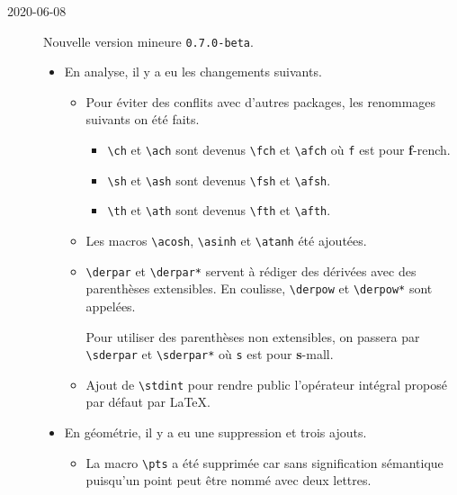 \documentclass[12pt,a4paper]{article}
\newcommand\env[1]{\texttt{#1}}
\newcommand\macro[1]{\env{\textbackslash{}#1}}
\theoremstyle{definition}
\begin{document}
\begin{description}

    \medskip
    \item[2020-06-08] Nouvelle version mineure \verb+0.7.0-beta+.
    
    \begin{itemize}[itemsep=.5em]
        \item En analyse, il y a eu les changements suivants.
        \begin{itemize}[itemsep=.5em]
            \item Pour éviter des conflits avec d'autres packages, les renommages suivants on été faits.
            \begin{itemize}[itemsep=.5em]
                \item \macro{ch} et \macro{ach} sont devenus \macro{fch} et \macro{afch} où \verb+f+ est pour \textbf{f}-rench.
    
                \item \macro{sh} et \macro{ash} sont devenus \macro{fsh} et \macro{afsh}.
    
                \item \macro{th} et \macro{ath} sont devenus \macro{fth} et \macro{afth}.
            \end{itemize}
    
    		\item Les macros \macro{acosh}, \macro{asinh} et \macro{atanh} été ajoutées.
    
     		\item \macro{derpar} et \macro{derpar*} servent à rédiger des dérivées avec des parenthèses extensibles. En coulisse, \macro{derpow} et \macro{derpow*} sont appelées.
    
            Pour utiliser des parenthèses non extensibles, on passera par \macro{sderpar} et \macro{sderpar*} où \verb+s+ est pour \textbf{s}-mall.
    
    		\item Ajout de \macro{stdint} pour rendre public l'opérateur intégral proposé par défaut par \LaTeX.
        \end{itemize}
    
    
        \item En géométrie, il y a eu une suppression et trois ajouts.
        \begin{itemize}[itemsep=.5em]
            \item La macro \macro{pts} a été supprimée car sans signification sémantique puisqu'un point peut être nommé avec deux lettres.
    

\end{itemize}
\end{itemize}
\end{description}
\end{document}
